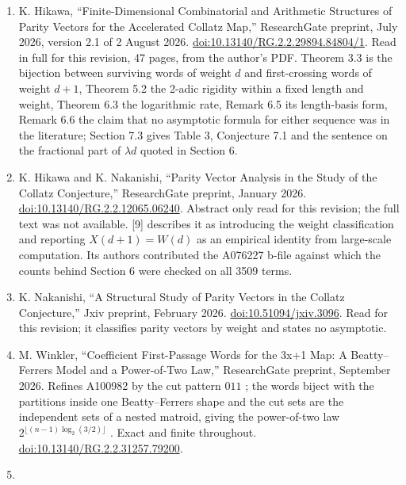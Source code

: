 \documentclass[11pt,a4paper]{article}
\begin{document}
\begin{enumerate}
  M. Winkler, ``Deterministic Structures in the Stopping Time Dynamics
  of the 3x + 1 Problem,'' arXiv:1709.03385 {[}math.GM{]}, 2017--2026.
  \href{https://arxiv.org/abs/1709.03385}{arXiv record}.
\item
  K. Hikawa, ``Finite-Dimensional Combinatorial and Arithmetic
  Structures of Parity Vectors for the Accelerated Collatz Map,''
  ResearchGate preprint, July 2026, version 2.1 of 2 August 2026.
  \href{https://doi.org/10.13140/RG.2.2.29894.84804/1}{doi:10.13140/RG.2.2.29894.84804/1}.
  Read in full for this revision, 47 pages, from the author's PDF.
  Theorem 3.3 is the bijection between surviving words of weight \(d\)
  and first-crossing words of weight \(d+1\), Theorem 5.2 the 2-adic
  rigidity within a fixed length and weight, Theorem 6.3 the logarithmic
  rate, Remark 6.5 its length-basis form, Remark 6.6 the claim that no
  asymptotic formula for either sequence was in the literature; Section
  7.3 gives Table 3, Conjecture 7.1 and the sentence on the fractional
  part of \(\lambda d\) quoted in Section 6.
\item
  K. Hikawa and K. Nakanishi, ``Parity Vector Analysis in the Study of
  the Collatz Conjecture,'' ResearchGate preprint, January 2026.
  \href{https://doi.org/10.13140/RG.2.2.12065.06240}{doi:10.13140/RG.2.2.12065.06240}.
  Abstract only read for this revision; the full text was not available.
  {[}9{]} describes it as introducing the weight classification and
  reporting \(X(d+1)=W(d)\) as an empirical identity from large-scale
  computation. Its authors contributed the A076227 b-file against which
  the counts behind Section 6 were checked on all 3509 terms.
\item
  K. Nakanishi, ``A Structural Study of Parity Vectors in the Collatz
  Conjecture,'' Jxiv preprint, February 2026.
  \href{https://doi.org/10.51094/jxiv.3096}{doi:10.51094/jxiv.3096}.
  Read for this revision; it classifies parity vectors by weight and
  states no asymptotic.
\item
  M. Winkler, ``Coefficient First-Passage Words for the 3x+1 Map: A
  Beatty--Ferrers Model and a Power-of-Two Law,'' ResearchGate preprint,
  September 2026. Refines A100982 by the cut pattern \(011\) ; the words
  biject with the partitions inside one Beatty--Ferrers shape and the
  cut sets are the independent sets of a nested matroid, giving the
  power-of-two law \(2^{\lfloor(n-1)\log_2(3/2)\rfloor}\) . Exact and
  finite throughout.
  \href{https://doi.org/10.13140/RG.2.2.31257.79200}{doi:10.13140/RG.2.2.31257.79200}.
\item

\end{enumerate}
\end{document}
